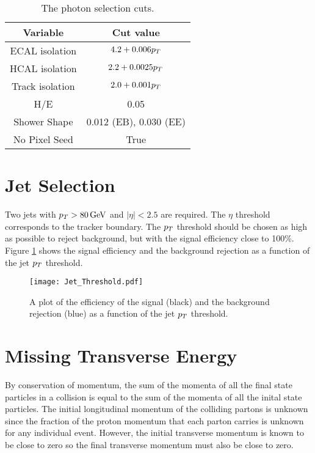 \begin{table}
\begin{center}
\begin{tabular}{|c|c|}
\hline
Variable & Cut value \\
\hline
ECAL isolation & $4.2 + 0.006p_{T}$ \\
HCAL isolation & $2.2 + 0.0025p_{T}$ \\
Track isolation & $2.0 + 0.001p_{T}$ \\
H/E & 0.05 \\
Shower Shape & 0.012 (EB), 0.030 (EE) \\
No Pixel Seed & True \\
\hline
\end{tabular}
\end{center}
\caption{The photon selection cuts.}
\label{tab:photoncuts}
\end{table}

\section{Jet Selection}

Two jets with $p_{T} > 80 \, \mathrm{GeV}$ and $|\eta| < 2.5$ are required. The $\eta$
threshold corresponds to the tracker boundary. The $p_{T}$ threshold should be
chosen as high as possible to reject background, but with the signal efficiency
close to 100\%. Figure \ref{fig:Jet_Threshold} shows the signal efficiency and 
the background rejection as a function of the jet $p_{T}$ threshold. 

\begin{figure}
\begin{center}
\texttt{[image: Jet\_Threshold.pdf]}
\end{center}
\caption{A plot of the efficiency of the signal (black) and the background
rejection (blue) as a function of the jet $p_{T}$ threshold.}
\label{fig:Jet_Threshold}
\end{figure}

\section{Missing Transverse Energy}
\label{sec:Missing_Transverse_Energy}

By conservation of momentum, the sum of the momenta of all the final state
particles in a collision is equal to the sum of the momenta of all the inital
state particles. The initial longitudinal momentum of the colliding partons is
unknown since the fraction of the proton momentum that each parton carries is
unknown for any individual event. However, the initial transverse momentum is
known to be close to zero so the final transverse momentum must also be close to 
zero. \\

